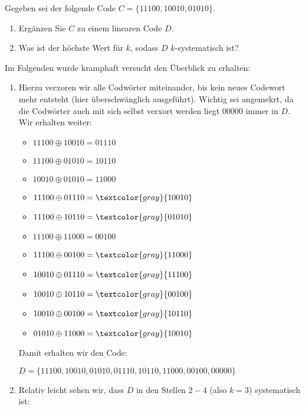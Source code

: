 \begin{aufgabe}
    Gegeben sei der folgende Code $C=\{11100, 10010, 01010\}$.
    \begin{enumerate}[label=\alph*)]
        \item Ergänzen Sie $C$ zu einem linearen Code $D$.
        \item Was ist der höchste Wert für $k$, sodass $D$ $k$-systematisch ist?
    \end{enumerate}
\Splitter
Im Folgenden wurde kramphaft versucht den Überblick zu erhalten:\smallskip
\begin{enumerate}[label=\alph*)]
    \item Hierzu verxoren wir alle Codwörter miteinander, bis kein neues Codewort mehr entsteht (hier überschwänglich ausgeführt). Wichtig sei angemekrt, da die Codwörter auch mit sich selbst verxort werden liegt $00000$ immer in $D$. Wir erhalten weiter:
    \begin{multicols}{2}
        \begin{itemize}[label=]\narrowitems
            \item \(11100 \oplus 10010 = 01110\)
            \item \(11100 \oplus 01010 = 10110\)
            \item \(10010 \oplus 01010 = 11000\)
            \item \(11100 \oplus 01110 = \textcolor{gray}{10010}\)
            \item \(11100 \oplus 10110 = \textcolor{gray}{01010}\)
            \item \(11100 \oplus 11000 = 00100\)
            \item \(11100 \oplus 00100 = \textcolor{gray}{11000}\)
            \item \(10010 \oplus 01110 = \textcolor{gray}{11100}\)
            \item \(10010 \oplus 10110 = \textcolor{gray}{00100}\)
            \item \(10010 \oplus 00100 = \textcolor{gray}{10110}\)
            \item \(01010 \oplus 11000 = \textcolor{gray}{10010}\)
        \end{itemize}
    \end{multicols}
    Damit erhalten wir den Code:\begin{centered}
        $D = \{11100,10010, 01010, 01110,10110,11000,00100,00000\}$
    \end{centered}
    \item Relativ leicht sehen wir, dass $D$ in den Stellen $2-4$ (also $k = 3$) systematisch ist:     

\end{enumerate}
\end{aufgabe}
